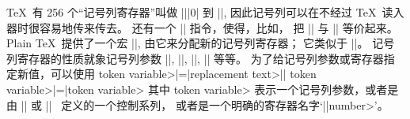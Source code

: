 {{{{{{{{%
\ddanger \1\TeX\ 有 256 个``记号列寄存器''叫做 |\toks||0| 到 ||,
因此记号列可以在不经过 \TeX\ 读入器时很容易地传来传去。%
还有一个 |\toksdef| 指令，使得，比如，
\begintt
\toksdef{}
\endtt
把 |\catch| 与 || 等价起来。%
Plain \TeX\ 提供了一个宏 |\newtoks|, 由它来分配新的记号列寄存器；
它类似于 |\newcount|。%
记号列寄存器的性质就象记号列参数 |\everypar|, |\everyhbox|, |\output|,
|\errhelp| 等等。%
为了给记号列参数或寄存器指定新值，可以使用
\begindisplay
\<token variable>|={|\<replacement text>|}|\cr
{}\<token variable>|=|\<token variable>\cr
\enddisplay
其中 \<token variable> 表示一个记号列参数，或者是由 |\toksdef| 或 |\newtoks|~%
定义的一个控制系列，
或者是一个明确的寄存器名字`|\toks|\<number>'。

}}}}}}}}
